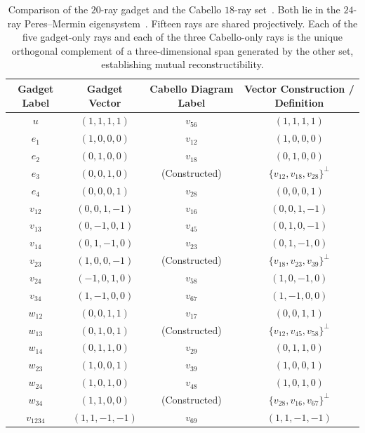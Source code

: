 \documentclass[%
  reprint,
  superscriptaddress,
  showpacs,
  showkeys,
  amsmath,amssymb,
  pra,
  longbibliography,
  floatfix,
  x11names
]{revtex4-2}
\newcommand{\rev}[1]{{\color{revisionblue}#1}}
\begin{document}
\begin{table}[ht]
\caption{\rev{Comparison of the $20$-ray gadget and the Cabello $18$-ray set~\cite{cabello-96,cabello:210401}.  Both lie in the $24$-ray Peres--Mermin eigensystem~\cite{peres111,mermin90b,peres-91,pavicic-2004ksafq,svozil-2024-convert-pra-externalfigures}.  Fifteen rays are shared projectively.  Each of the five gadget-only rays and each of the three Cabello-only rays is the unique orthogonal complement of a three-dimensional span generated by the other set, establishing mutual reconstructibility.}}
\label{tab:vector-equivalence}
\begin{ruledtabular}
\begin{tabular}{cccc}
Gadget Label & Gadget Vector & Cabello Diagram Label & Vector Construction / Definition \\
\hline
$u$ & $(1,1,1,1)$ & $v_{56}$ & $(1,1,1,1)$ \\
$e_1$ & $(1,0,0,0)$ & $v_{12}$ & $(1,0,0,0)$ \\
$e_2$ & $(0,1,0,0)$ & $v_{18}$ & $(0,1,0,0)$ \\
$e_3$ & $(0,0,1,0)$ & (Constructed) & $\{v_{12}, v_{18}, v_{28}\}^\perp$ \\
$e_4$ & $(0,0,0,1)$ & $v_{28}$ & $(0,0,0,1)$ \\
\hline
$v_{12}$ & $(0,0,1,-1)$ & $v_{16}$ & $(0,0,1,-1)$ \\
$v_{13}$ & $(0,-1,0,1)$ & $v_{45}$ & $(0,1,0,-1)$ \\
$v_{14}$ & $(0,1,-1,0)$ & $v_{23}$ & $(0,1,-1,0)$ \\
$v_{23}$ & $(1,0,0,-1)$ & \rev{(Constructed)} & \rev{$\{v_{18},v_{23},v_{39}\}^\perp$} \\
$v_{24}$ & $(-1,0,1,0)$ & $v_{58}$ & $(1,0,-1,0)$ \\
$v_{34}$ & $(1,-1,0,0)$ & $v_{67}$ & $(1,-1,0,0)$ \\
\hline
$w_{12}$ & $(0,0,1,1)$ & $v_{17}$ & $(0,0,1,1)$ \\
$w_{13}$ & $(0,1,0,1)$ & \rev{(Constructed)} & \rev{$\{v_{12},v_{45},v_{58}\}^\perp$} \\
$w_{14}$ & $(0,1,1,0)$ & $v_{29}$ & $(0,1,1,0)$ \\
$w_{23}$ & $(1,0,0,1)$ & $v_{39}$ & $(1,0,0,1)$ \\
$w_{24}$ & $(1,0,1,0)$ & $v_{48}$ & $(1,0,1,0)$ \\
$w_{34}$ & $(1,1,0,0)$ & \rev{(Constructed)} & \rev{$\{v_{28},v_{16},v_{67}\}^\perp$} \\
\hline
$v_{1234}$ & $(1,1,-1,-1)$ & $v_{69}$ & $(1,1,-1,-1)$ \\

\end{tabular}
\end{ruledtabular}
\end{table}
\end{document}
